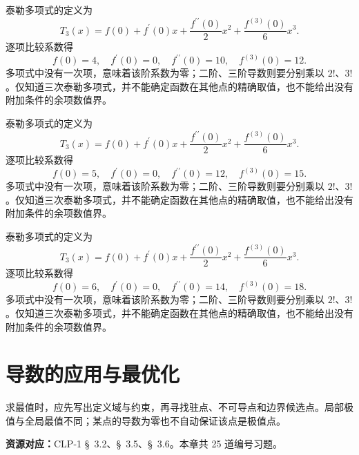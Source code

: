 \documentclass[UTF8,12pt,a4paper,fontset=fandol]{ctexart}
\begin{document}
\begin{solve}\label{ans:c10q23}
泰勒多项式的定义为
\[
T_3(x)=f(0)+f^{\prime}(0)x+\frac{f^{\prime\prime}(0)}2x^2+\frac{f^{(3)}(0)}6x^3.
\]
逐项比较系数得
\[
f(0)=4,\quad f^{\prime}(0)=0,\quad f^{\prime\prime}(0)=10,\quad f^{(3)}(0)=12.
\]
多项式中没有一次项，意味着该阶系数为零；二阶、三阶导数则要分别乘以 $2!$、$3!$。仅知道三次泰勒多项式，并不能确定函数在其他点的精确取值，也不能给出没有附加条件的余项数值界。
\end{solve}

\begin{solve}\label{ans:c10q24}
泰勒多项式的定义为
\[
T_3(x)=f(0)+f^{\prime}(0)x+\frac{f^{\prime\prime}(0)}2x^2+\frac{f^{(3)}(0)}6x^3.
\]
逐项比较系数得
\[
f(0)=5,\quad f^{\prime}(0)=0,\quad f^{\prime\prime}(0)=12,\quad f^{(3)}(0)=15.
\]
多项式中没有一次项，意味着该阶系数为零；二阶、三阶导数则要分别乘以 $2!$、$3!$。仅知道三次泰勒多项式，并不能确定函数在其他点的精确取值，也不能给出没有附加条件的余项数值界。
\end{solve}

\begin{solve}\label{ans:c10q25}
泰勒多项式的定义为
\[
T_3(x)=f(0)+f^{\prime}(0)x+\frac{f^{\prime\prime}(0)}2x^2+\frac{f^{(3)}(0)}6x^3.
\]
逐项比较系数得
\[
f(0)=6,\quad f^{\prime}(0)=0,\quad f^{\prime\prime}(0)=14,\quad f^{(3)}(0)=18.
\]
多项式中没有一次项，意味着该阶系数为零；二阶、三阶导数则要分别乘以 $2!$、$3!$。仅知道三次泰勒多项式，并不能确定函数在其他点的精确取值，也不能给出没有附加条件的余项数值界。
\end{solve}

\clearpage
\section{导数的应用与最优化}\label{sec:ch11}
求最值时，应先写出定义域与约束，再寻找驻点、不可导点和边界候选点。局部极值与全局最值不同；某点的导数为零也不自动保证该点是极值点。

\textbf{资源对应：}CLP-1 \S~3.2、\S~3.5、\S~3.6。本章共 25 道编号习题。
\end{document}
